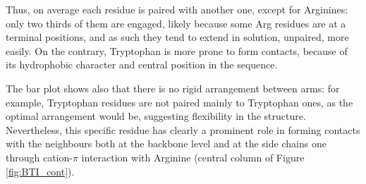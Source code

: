 Thus, on average each residue is paired with another one, except for Arginines: only two thirds of them are engaged, likely because some Arg residues are at a terminal positions, and as such they tend to extend in solution, unpaired, more easily. On the contrary, Tryptophan is more prone to form contacts, because of its hydrophobic character and central position in the sequence.

The bar plot shows also that there is no rigid arrangement between arms: for example, Tryptophan residues are not paired mainly to Tryptophan ones, as the optimal arrangement would be, suggesting flexibility in the structure.
%
Nevertheless, this specific residue has clearly a prominent role in forming contacts with the neighbours both at the backbone level and at the side chains one through cation-$\pi$ interaction with Arginine (central column of Figure \ref{fig:BTI_cont}).

